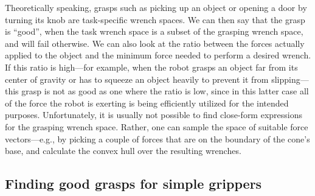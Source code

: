 Theoretically speaking, grasps such as picking up an object or opening a door by turning its knob are task-specific wrench spaces. We can then say that the grasp is ``good'', when the task wrench space is a subset of the grasping wrench space, and will fail otherwise. We can also look at the ratio between the forces actually applied to the object and the minimum force needed to perform a desired wrench. If this ratio is high---for example, when the robot grasps an object far from its center of gravity or has to squeeze an object heavily to prevent it from slipping---this grasp is not as good as one where the ratio is low, since in this latter case all of the force the robot is exerting is being efficiently utilized for the intended purposes.
Unfortunately, it is usually not possible to find close-form expressions for the grasping wrench space. Rather, one can sample the space of suitable force vectors---e.g., by picking a couple of forces that are on the boundary of the cone's base, and calculate the convex hull over the resulting wrenches.

\subsection{Finding good grasps for simple grippers}

